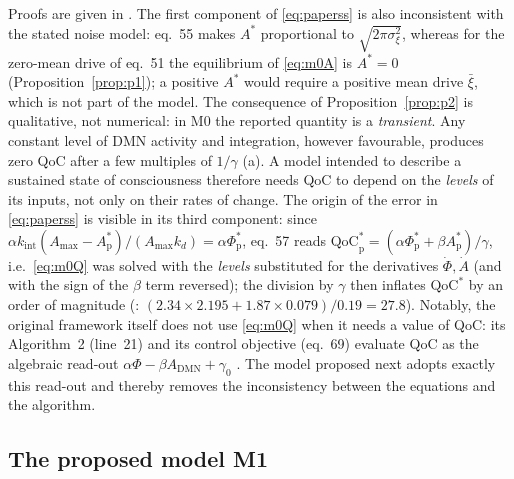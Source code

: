 \documentclass[12pt,a4paper]{article}
\theoremstyle{plain}
\theoremstyle{definition}
\theoremstyle{remark}
\newcommand{\QoC}{\mathrm{QoC}}
\newcommand{\kint}{k_{\mathrm{int}}}
\newcommand{\kd}{k_{d}}
\newcommand{\Amax}{A_{\max}}
\begin{document}
Proofs are given in . The first component of \eqref{eq:paperss} is also inconsistent with the stated noise model: eq.~55 makes $A^*$ proportional to $\sqrt{2\pi\sigma_\xi^2}$, whereas for the zero-mean drive of eq.~51 the equilibrium of \eqref{eq:m0A} is $A^*=0$ (Proposition~\ref{prop:p1}); a positive $A^*$ would require a positive mean drive $\bar\xi$, which is not part of the model. The consequence of Proposition~\ref{prop:p2} is qualitative, not numerical: in M0 the reported quantity is a \emph{transient}. Any constant level of DMN activity and integration, however favourable, produces zero QoC after a few multiples of $1/\gamma$ (a). A model intended to describe a sustained state of consciousness therefore needs QoC to depend on the \emph{levels} of its inputs, not only on their rates of change. The origin of the error in \eqref{eq:paperss} is visible in its third component: since $\alpha\kint(\Amax-A^*_{\mathrm p})/(\Amax\kd)=\alpha\Phi^*_{\mathrm p}$, eq.~57 reads $\QoC^*_{\mathrm p}=(\alpha\Phi^*_{\mathrm p}+\beta A^*_{\mathrm p})/\gamma$, i.e.\ \eqref{eq:m0Q} was solved with the \emph{levels} substituted for the derivatives $\dot\Phi,\dot A$ (and with the sign of the $\beta$ term reversed); the division by $\gamma$ then inflates $\QoC^*$ by an order of magnitude (: $(2.34\times2.195+1.87\times0.079)/0.19=27.8$). Notably, the original framework itself does not use \eqref{eq:m0Q} when it needs a value of QoC: its Algorithm~2 (line~21) and its control objective (eq.~69) evaluate QoC as the algebraic read-out $\alpha\Phi-\beta A_{\mathrm{DMN}}+\gamma_0$ \citep{BQI}. The model proposed next adopts exactly this read-out and thereby removes the inconsistency between the equations and the algorithm.

\subsection{The proposed model M1}
\label{sec:m1}
\end{document}
